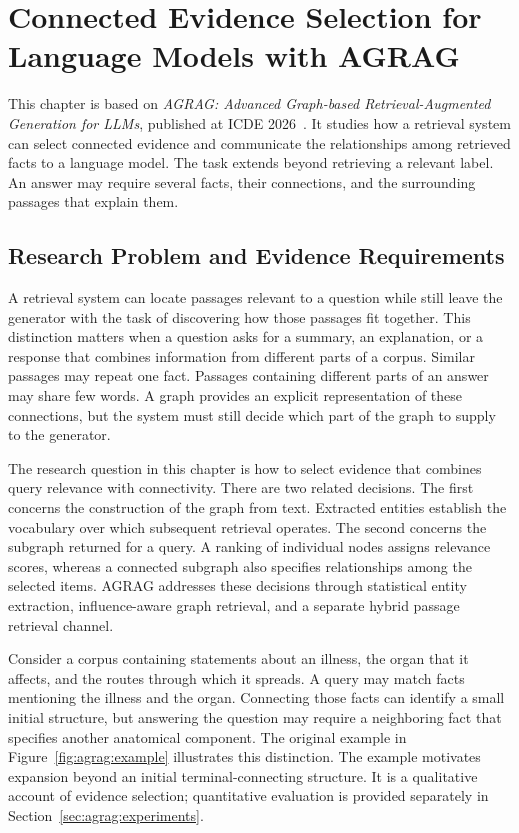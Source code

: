 \chapter{Connected Evidence Selection for Language Models with AGRAG}
\label{ch:agrag}

This chapter is based on \emph{AGRAG: Advanced Graph-based Retrieval-Augmented Generation for LLMs}, published at ICDE 2026~\cite{agrag-paper}. It studies how a retrieval system can select connected evidence and communicate the relationships among retrieved facts to a language model. The task extends beyond retrieving a relevant label. An answer may require several facts, their connections, and the surrounding passages that explain them.

\section{Research Problem and Evidence Requirements}
\label{sec:agrag:problem}
A retrieval system can locate passages relevant to a question while still leave the generator with the task of discovering how those passages fit together. This distinction matters when a question asks for a summary, an explanation, or a response that combines information from different parts of a corpus. Similar passages may repeat one fact. Passages containing different parts of an answer may share few words. A graph provides an explicit representation of these connections, but the system must still decide which part of the graph to supply to the generator.

The research question in this chapter is how to select evidence that combines query relevance with connectivity. There are two related decisions. The first concerns the construction of the graph from text. Extracted entities establish the vocabulary over which subsequent retrieval operates. The second concerns the subgraph returned for a query. A ranking of individual nodes assigns relevance scores, whereas a connected subgraph also specifies relationships among the selected items. AGRAG addresses these decisions through statistical entity extraction, influence-aware graph retrieval, and a separate hybrid passage retrieval channel.

Consider a corpus containing statements about an illness, the organ that it affects, and the routes through which it spreads. A query may match facts mentioning the illness and the organ. Connecting those facts can identify a small initial structure, but answering the question may require a neighboring fact that specifies another anatomical component. The original example in Figure~\ref{fig:agrag:example} illustrates this distinction. The example motivates expansion beyond an initial terminal-connecting structure. It is a qualitative account of evidence selection; quantitative evaluation is provided separately in Section~\ref{sec:agrag:experiments}.

